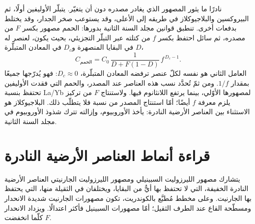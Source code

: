 نادرًا ما يثور المصهور الذي يغادر مصدره دون أن يتغيّر. يتبلّر
الأوليفين أولًا، ثم البيروكسين والبلاجيوكلاز في طريقه إلى الأعلى، وقد يستوعب صخر
الجدار، وقد يختلط بدفعات أخرى. تنطبق قوانين مجلد السنة الثانية
بدورها: الحمم مصهور بكسر $F$ من مصدره، ثم سائل
احتفظ بكسر $f$ من كتلته عبر التبلّر التجزيئي، بحيث
يكون، لعنصر له $D$ في البقايا المنصهرة و$D_c$ في
المعادن المتبلّرة،
\[
C_{\text{الحمم}} = C_0\,\frac{1}{D + F(1 - D)}\,f^{\,D_c - 1}.
\]
العامل الثاني هو نفسه لكلّ عنصر ترفضه المعادن المتبلّرة،
$D_c \approx 0$: فهو يُدرّجها جميعًا بمقدار $1/f$. ومن ثمّ تُحدَّد نسب
هذه العناصر عند المصدر، والحمم التي فقدت الأوليفين
تحتفظ بنسبة La/Yb لمصهورها الأوّلي، بينما يرتفع اللانثانوم فيها. ولاستنتاج $F$
من تركيز يلزم معرفة $f$ أيضًا؛ أمّا استنتاج المصدر من نسبة
فلا يتطلّب ذلك. البلاجيوكلاز هو الاستثناء بين العناصر الأرضية النادرة: يأخذ الأوروبيوم،
وإزالته تترك شذوذ الأوروبيوم في مجلد السنة الثانية.

\section{قراءة أنماط العناصر الأرضية النادرة}\label{sec:b3:trace-element-modelling:patterns}

يتشارك مصهور الليرزوليت السبينيلي ومصهور الليرزوليت الجارنيتي العناصر
الأرضية النادرة الخفيفة، التي لا تحتفظ بها أيٌّ من البقايا، ويختلفان في الثقيلة منها،
التي يحتفظ بها الجارنيت. وعلى مخطط مُطبَّع بالكوندريت، تكون مصهورات الجارنيت
شديدة الانحدار ومسطّحة القاع عند الطرف الثقيل؛ أمّا مصهورات السبينيل فأكثر اعتدالًا. ويزداد
الانحدار كلّما انخفضت $F$.

